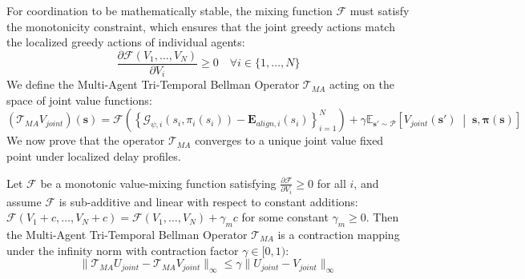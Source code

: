 \documentclass[manuscript, screen, review]{jair}
\begin{document}
For coordination to be mathematically stable, the mixing function $\mathcal{F}$ must satisfy the monotonicity constraint, which ensures that the joint greedy actions match the localized greedy actions of individual agents:
\begin{equation}
    \frac{\partial \mathcal{F}(V_1, \dots, V_N)}{\partial V_i} \ge 0 \quad \forall i \in \{1, \dots, N\}
\end{equation}
We define the Multi-Agent Tri-Temporal Bellman Operator $\mathcal{T}_{MA}$ acting on the space of joint value functions:
\begin{equation}
    \left( \mathcal{T}_{MA} V_{joint} \right)(\mathbf{s}) = \mathcal{F}\left( \left\{ \mathcal{G}_{\psi, i}(s_i, \pi_i(s_i)) - \mathbf{E}_{align, i}(s_i) \right\}_{i=1}^N \right) + \gamma \mathbb{E}_{\mathbf{s}' \sim \mathcal{P}} \left[ V_{joint}(\mathbf{s}') \;\middle|\; \mathbf{s}, \boldsymbol{\pi}(\mathbf{s}) \right]
\end{equation}
We now prove that the operator $\mathcal{T}_{MA}$ converges to a unique joint value fixed point under localized delay profiles.

\begin{theorem}\label{thm:ma_contraction}
Let $\mathcal{F}$ be a monotonic value-mixing function satisfying $\frac{\partial \mathcal{F}}{\partial V_i} \ge 0$ for all $i$, and assume $\mathcal{F}$ is sub-additive and linear with respect to constant additions: $\mathcal{F}(V_1 + c, \dots, V_N + c) = \mathcal{F}(V_1, \dots, V_N) + \gamma_m c$ for some constant $\gamma_m \ge 0$. Then the Multi-Agent Tri-Temporal Bellman Operator $\mathcal{T}_{MA}$ is a contraction mapping under the infinity norm with contraction factor $\gamma \in [0, 1)$:
\begin{equation}
    \| \mathcal{T}_{MA} U_{joint} - \mathcal{T}_{MA} V_{joint} \|_\infty \le \gamma \| U_{joint} - V_{joint} \|_\infty
\end{equation}
\end{theorem}
\end{document}
